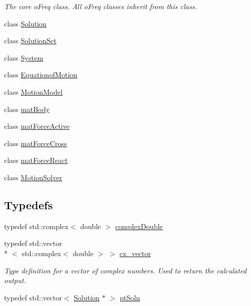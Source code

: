 \begin{DoxyCompactItemize}
\begin{DoxyCompactList}\small\item\em The core o\-Freq class. All o\-Freq classes inherit from this class. \end{DoxyCompactList}\item 
class \hyperlink{classosea_1_1ofreq_1_1_solution}{Solution}
\item 
class \hyperlink{classosea_1_1ofreq_1_1_solution_set}{Solution\-Set}
\item 
class \hyperlink{classosea_1_1ofreq_1_1_system}{System}
\item 
class \hyperlink{classosea_1_1ofreq_1_1_equationof_motion}{Equationof\-Motion}
\item 
class \hyperlink{classosea_1_1ofreq_1_1_motion_model}{Motion\-Model}
\item 
class \hyperlink{classosea_1_1ofreq_1_1mat_body}{mat\-Body}
\item 
class \hyperlink{classosea_1_1ofreq_1_1mat_force_active}{mat\-Force\-Active}
\item 
class \hyperlink{classosea_1_1ofreq_1_1mat_force_cross}{mat\-Force\-Cross}
\item 
class \hyperlink{classosea_1_1ofreq_1_1mat_force_react}{mat\-Force\-React}
\item 
class \hyperlink{classosea_1_1ofreq_1_1_motion_solver}{Motion\-Solver}
\end{DoxyCompactItemize}
\subsection*{Typedefs}
\begin{DoxyCompactItemize}
\item 
typedef std\-::complex$<$ double $>$ \hyperlink{namespaceosea_1_1ofreq_a40cad4695a41123a7ae6ab0b6e8b1664}{complex\-Double}
\item 
\hypertarget{namespaceosea_1_1ofreq_a42bf1d8bbba99693142c4184486ad3e0}{typedef std\-::vector\\*
$<$ std\-::complex$<$ double $>$ $>$ \hyperlink{namespaceosea_1_1ofreq_a42bf1d8bbba99693142c4184486ad3e0}{cx\-\_\-vector}}\label{namespaceosea_1_1ofreq_a42bf1d8bbba99693142c4184486ad3e0}

\begin{DoxyCompactList}\small\item\em Type definition for a vector of complex numbers. Used to return the calculated output. \end{DoxyCompactList}\item 
typedef std\-::vector$<$ \hyperlink{classosea_1_1ofreq_1_1_solution}{Solution} $\ast$ $>$ \hyperlink{namespaceosea_1_1ofreq_a951464fca478bccfc9e5295910e5eec3}{pt\-Soln}
\end{DoxyCompactItemize}


